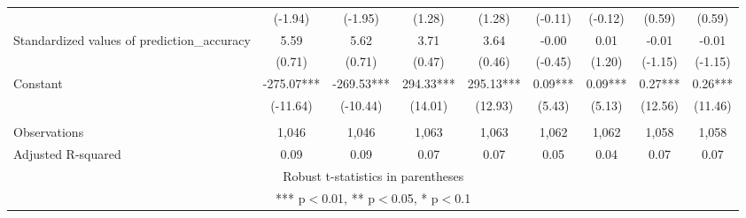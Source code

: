 \documentclass[]{article}
\begin{document}
\begin{tabular}{lcccccccc}
 & (-1.94) & (-1.95) & (1.28) & (1.28) & (-0.11) & (-0.12) & (0.59) & (0.59) \\
Standardized values of prediction\_accuracy & 5.59 & 5.62 & 3.71 & 3.64 & -0.00 & 0.01 & -0.01 & -0.01 \\
 & (0.71) & (0.71) & (0.47) & (0.46) & (-0.45) & (1.20) & (-1.15) & (-1.15) \\
Constant & -275.07*** & -269.53*** & 294.33*** & 295.13*** & 0.09*** & 0.09*** & 0.27*** & 0.26*** \\
 & (-11.64) & (-10.44) & (14.01) & (12.93) & (5.43) & (5.13) & (12.56) & (11.46) \\
 &  &  &  &  &  &  &  &  \\
Observations & 1,046 & 1,046 & 1,063 & 1,063 & 1,062 & 1,062 & 1,058 & 1,058 \\
 Adjusted R-squared & 0.09 & 0.09 & 0.07 & 0.07 & 0.05 & 0.04 & 0.07 & 0.07 \\ \hline
\multicolumn{9}{c}{ Robust t-statistics in parentheses} \\
\multicolumn{9}{c}{ *** p$<$0.01, ** p$<$0.05, * p$<$0.1} \\
\end{tabular}
\end{document}
